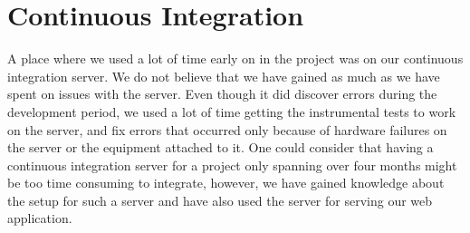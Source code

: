 
\section{Continuous Integration}
A place where we used a lot of time early on in the project was on our continuous integration server. We do not believe that we have gained as much as we have spent on issues with the server. Even though it did discover errors during the development period, we used a lot of time getting the instrumental tests to work on the server, and fix errors that occurred only because of hardware failures on the server or the equipment attached to it. One could consider that having a continuous integration server for a project only spanning over four months might be too time consuming to integrate, however, we have gained knowledge about the setup for such a server and have also used the server for serving our web application. 